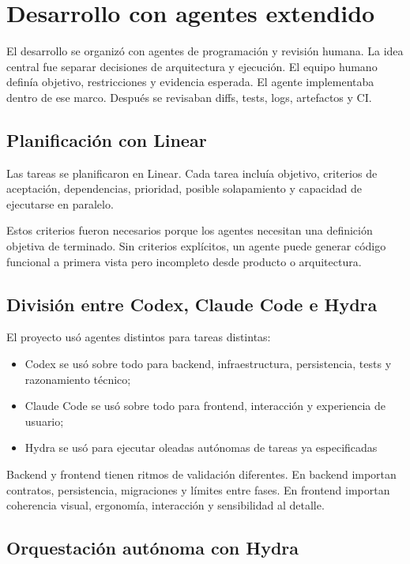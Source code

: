 \section{Desarrollo con agentes extendido}
\label{ap:desarrollo-agentes-extendido}

El desarrollo se organizó con agentes de programación y revisión humana. La
idea central fue separar decisiones de arquitectura y ejecución. El equipo
humano definía objetivo, restricciones y evidencia esperada. El agente
implementaba dentro de ese marco. Después se revisaban diffs, tests, logs,
artefactos y CI.

\subsection{Planificación con Linear}

Las tareas se planificaron en Linear. Cada tarea incluía objetivo, criterios de
aceptación, dependencias, prioridad, posible solapamiento y capacidad de
ejecutarse en paralelo.

Estos criterios fueron necesarios porque los agentes necesitan una definición
objetiva de terminado. Sin criterios explícitos, un agente puede generar código
funcional a primera vista pero incompleto desde producto o arquitectura.

\subsection{División entre Codex, Claude Code e Hydra}

El proyecto usó agentes distintos para tareas distintas:

\begin{itemize}
\item Codex se usó sobre todo para backend, infraestructura, persistencia, tests y razonamiento técnico;
\item Claude Code se usó sobre todo para frontend, interacción y experiencia de usuario;
\item Hydra se usó para ejecutar oleadas autónomas de tareas ya especificadas
\end{itemize}

Backend y frontend tienen ritmos de validación diferentes. En backend importan
contratos, persistencia, migraciones y límites entre fases. En frontend importan
coherencia visual, ergonomía, interacción y sensibilidad al detalle.

\subsection{Orquestación autónoma con Hydra}

